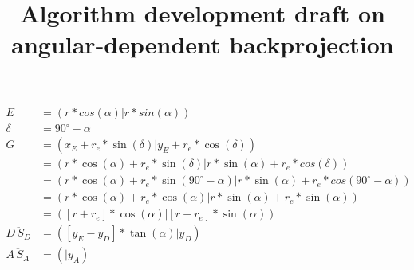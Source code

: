 \documentclass[a4paper,10pt,fleqn]{scrartcl}
\date{}
\title{Algorithm development draft on angular-dependent backprojection}
\begin{document}
\maketitle
\begin{align}
E &= (r * cos(\alpha) | r * sin(\alpha)) \\
\delta &= 90^\circ - \alpha \\
G &= (x_E + r_e * \sin(\delta) | y_E + r_e * \cos(\delta)) \\
  &= (r * \cos(\alpha) + r_e * \sin(\delta) | r * \sin(\alpha) + r_e * cos(\delta))\\
  &= (r * \cos(\alpha) + r_e * \sin(90^\circ - \alpha) | r * \sin(\alpha) + r_e * cos(90^\circ - \alpha))\\
  &= (r * \cos(\alpha) + r_e * \cos(\alpha) | r * \sin(\alpha) + r_e * \sin(\alpha))\\
  &= ([r + r_e] * \cos(\alpha) | [r + r_e] * \sin(\alpha))\\
\overline{D\,S_D} &= ([y_E - y_D] * \tan(\alpha)| y_D)\\
\overline{A\,S_A} &= ( | y_A )
\end{align}
\end{document}
